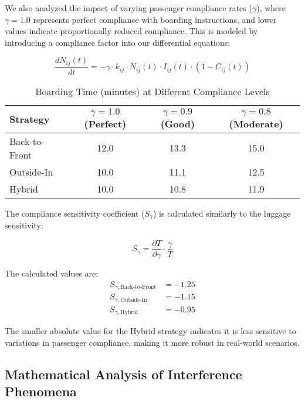 \documentclass[12pt]{article}
\begin{document}
We also analyzed the impact of varying passenger compliance rates ($\gamma$), where $\gamma = 1.0$ represents perfect compliance with boarding instructions, and lower values indicate proportionally reduced compliance. This is modeled by introducing a compliance factor into our differential equations:

\begin{equation}
\frac{dN_{ij}(t)}{dt} = -\gamma \cdot k_{ij} \cdot N_{ij}(t) \cdot I_{ij}(t) \cdot (1 - C_{ij}(t))
\end{equation}

\begin{table}[h]
\centering
\caption{Boarding Time (minutes) at Different Compliance Levels}
\begin{tabular}{lccc}
\toprule
\textbf{Strategy} & \textbf{$\gamma = 1.0$ (Perfect)} & \textbf{$\gamma = 0.9$ (Good)} & \textbf{$\gamma = 0.8$ (Moderate)} \\
\midrule
Back-to-Front & 12.0 & 13.3 & 15.0 \\
Outside-In & 10.0 & 11.1 & 12.5 \\
Hybrid & 10.0 & 10.8 & 11.9 \\
\bottomrule
\end{tabular}
\label{tab:compliance_sensitivity}
\end{table}

The compliance sensitivity coefficient ($S_{\gamma}$) is calculated similarly to the luggage sensitivity:

\begin{equation}
S_{\gamma} = \frac{\partial T}{\partial \gamma} \cdot \frac{\gamma}{T}
\end{equation}

The calculated values are:
\begin{align*}
S_{\gamma,\text{Back-to-Front}} &= -1.25 \\
S_{\gamma,\text{Outside-In}} &= -1.15 \\
S_{\gamma,\text{Hybrid}} &= -0.95
\end{align*}

The smaller absolute value for the Hybrid strategy indicates it is less sensitive to variations in passenger compliance, making it more robust in real-world scenarios.

\subsection{Mathematical Analysis of Interference Phenomena}
\end{document}
